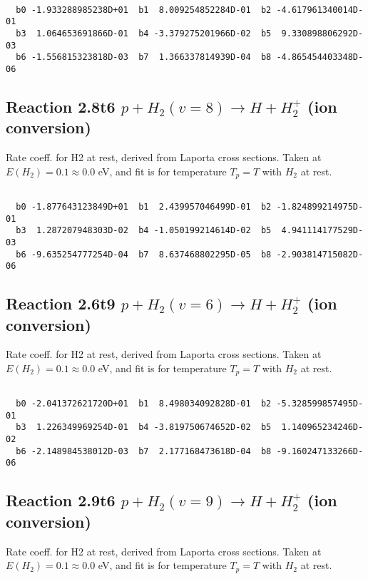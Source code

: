 \begin{small}\begin{verbatim}

  b0 -1.933288985238D+01  b1  8.009254852284D-01  b2 -4.617961340014D-01
  b3  1.064653691866D-01  b4 -3.379275201966D-02  b5  9.330898806292D-03
  b6 -1.556815323818D-03  b7  1.366337814939D-04  b8 -4.865454403348D-06

\end{verbatim}\end{small}

\newpage
\subsection{
Reaction 2.8t6
$ p + H_2(v=8) \rightarrow H + H_2^+$ (ion conversion)
}
Rate coeff. for H2 at rest, derived from Laporta cross sections.
Taken at $E(H_2) = 0.1 \approx 0.0$ eV,  and fit is for temperature $T_p=T$ with $H_2$ at rest.

\begin{small}\begin{verbatim}

  b0 -1.877643123849D+01  b1  2.439957046499D-01  b2 -1.824899214975D-01
  b3  1.287207948303D-02  b4 -1.050199214614D-02  b5  4.941114177529D-03
  b6 -9.635254777254D-04  b7  8.637468802295D-05  b8 -2.903814715082D-06

\end{verbatim}\end{small}

\newpage
\subsection{
Reaction 2.6t9
$ p + H_2(v=6) \rightarrow H + H_2^+$ (ion conversion)
}
Rate coeff. for H2 at rest, derived from Laporta cross sections.
Taken at $E(H_2) = 0.1 \approx 0.0$ eV,  and fit is for temperature $T_p=T$ with $H_2$ at rest.

\begin{small}\begin{verbatim}

  b0 -2.041372621720D+01  b1  8.498034092828D-01  b2 -5.328599857495D-01
  b3  1.226349969254D-01  b4 -3.819750674652D-02  b5  1.140965234246D-02
  b6 -2.148984538012D-03  b7  2.177168473618D-04  b8 -9.160247133266D-06

\end{verbatim}\end{small}

\newpage
\subsection{
Reaction 2.9t6
$ p + H_2(v=9) \rightarrow H + H_2^+$ (ion conversion)
}
Rate coeff. for H2 at rest, derived from Laporta cross sections.
Taken at $E(H_2) = 0.1 \approx 0.0$ eV,  and fit is for temperature $T_p=T$ with $H_2$ at rest.

